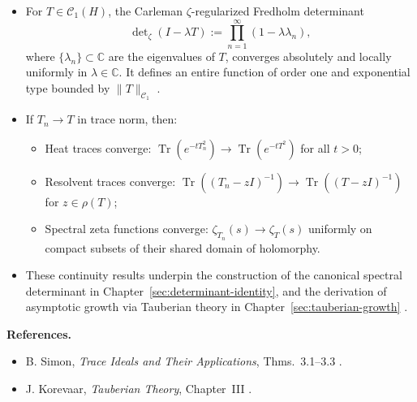 \begin{definition}
\begin{itemize}
    \item For \( T \in \mathcal{C}_1(H) \), the Carleman \(\zeta\)-regularized Fredholm determinant
    \[
    \det\nolimits_{\zeta}(I - \lambda T) := \prod_{n=1}^\infty (1 - \lambda \lambda_n),
    \]
    where \( \{\lambda_n\} \subset \mathbb{C} \) are the eigenvalues of \( T \), converges absolutely and locally uniformly in \( \lambda \in \mathbb{C} \). It defines an entire function of order one and exponential type bounded by \( \|T\|_{\mathcal{C}_1} \) \cite[Thm.~3.1]{Simon2005TraceIdeals}.

    \item If \( T_n \to T \) in trace norm, then:
    \begin{itemize}
        \item Heat traces converge: \( \operatorname{Tr}(e^{-t T_n^2}) \to \operatorname{Tr}(e^{-t T^2}) \) for all \( t > 0 \);
        \item Resolvent traces converge: \( \operatorname{Tr}((T_n - zI)^{-1}) \to \operatorname{Tr}((T - zI)^{-1}) \) for \( z \in \rho(T) \);
        \item Spectral zeta functions converge: \( \zeta_{T_n}(s) \to \zeta_T(s) \) uniformly on compact subsets of their shared domain of holomorphy.
    \end{itemize}

    \item These continuity results underpin the construction of the canonical spectral determinant in Chapter~\ref{sec:determinant-identity}, and the derivation of asymptotic growth via Tauberian theory in Chapter~\ref{sec:tauberian-growth} \cite{Korevaar2004Tauberian}.
\end{itemize}

\medskip
\noindent\textbf{References.}
\begin{itemize}
    \item B. Simon, \emph{Trace Ideals and Their Applications}, Thms.~3.1–3.3 \cite{Simon2005TraceIdeals}.
    \item J. Korevaar, \emph{Tauberian Theory}, Chapter~III \cite{Korevaar2004Tauberian}.
\end{itemize}
\end{definition}
